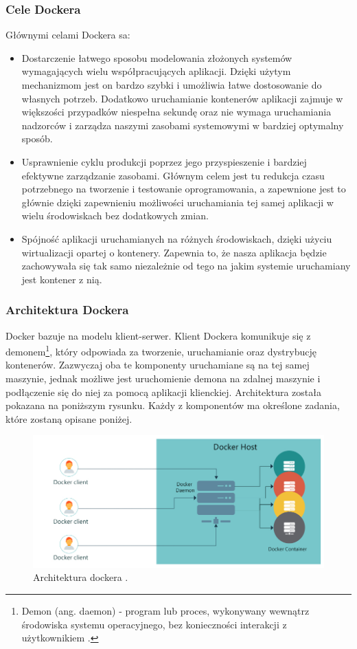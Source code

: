 \documentclass[12pt]{report}
\let\Oldsubsubsection\subsubsection
\renewcommand{\subsubsection}{\FloatBarrier\Oldsubsubsection}
\begin{document}
\subsubsection{Cele Dockera}
Głównymi celami Dockera sa:
\begin{itemize}
\item Dostarczenie łatwego sposobu modelowania złożonych systemów wymagają\-cych wielu współpracujących aplikacji. Dzięki użytym mechanizmom jest on bardzo szybki i umożliwia łatwe dostosowanie do własnych potrzeb. Dodatkowo uruchamianie kontenerów aplikacji zajmuje w większości przypadków niespełna sekundę oraz nie wymaga uruchamiania nadzorców i zarządza naszymi zasobami systemowymi w bardziej optymalny sposób.

\item Usprawnienie cyklu produkcji poprzez jego przyspieszenie i bardziej efektywne zarządzanie zasobami. Głównym celem jest tu redukcja czasu potrzebnego na tworzenie i testowanie oprogramowania, a zapewnione jest to głównie dzięki zapewnieniu możliwości uruchamiania tej samej aplikacji w wielu środowiskach bez dodatkowych zmian.

\item Spójność aplikacji uruchamianych na różnych środowiskach, dzięki użyciu wirtualizacji opartej o kontenery. Zapewnia to, że nasza aplikacja będzie zachowywała się tak samo niezależnie od tego na jakim systemie uruchamiany jest kontener z nią.
\end{itemize}

\subsubsection{Architektura Dockera}
Docker bazuje na modelu klient-serwer. Klient Dockera komunikuje się z demonem\footnote{Demon (ang. daemon) - program lub proces, wykonywany wewnątrz środowiska systemu operacyjnego, bez konieczności interakcji z użytkownikiem \cite{linux}.}, który odpowiada za tworzenie, uruchamianie oraz dystrybucję kontenerów. Zazwyczaj oba te komponenty uruchamiane są na tej samej maszynie, jednak możliwe jest uruchomienie demona na zdalnej maszynie i podłączenie się do niej za pomocą aplikacji klienckiej. Architektura została pokazana na poniższym rysunku. Każdy z komponentów ma określone zadania, które zostaną opisane poniżej.

\begin{figure}[h]
	\centering
	\includegraphics[width=1\textwidth]{images/dockerArch.jpg}
	\caption{Architektura dockera \cite{dockerArchImg}.}
\end{figure}
\end{document}
